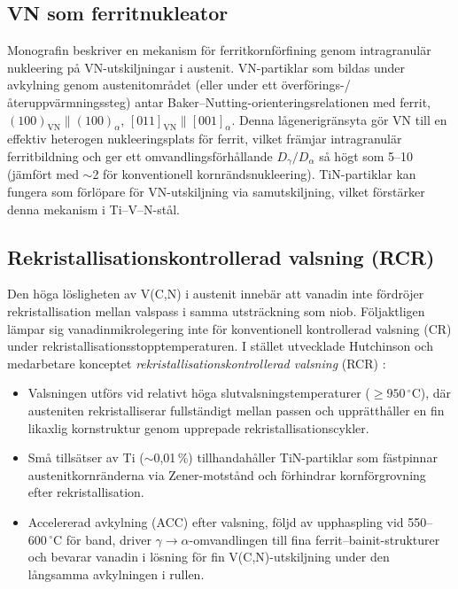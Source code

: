 \documentclass[11pt,a4paper]{article}
\begin{document}
\subsection{VN som ferritnukleator}

Monografin beskriver en mekanism f\"or ferritkornf\"orfining genom
intragranul\"ar nukleering p\aa{} VN-utskiljningar i austenit.
VN-partiklar som bildas under avkylning genom austenitomr\aa{}det (eller
under ett \"overf\"orings-/\aa{}teruppv\"armningssteg) antar
Baker--Nutting-orienteringsrelationen med ferrit,
$(100)_\text{VN}\parallel(100)_\alpha$,
$[011]_\text{VN}\parallel[001]_\alpha$.  Denna l\aa{}generigr\"ansyta
g\"or VN till en effektiv heterogen nukleeringsplats f\"or ferrit, vilket
fr\"amjar intragranul\"ar ferritbildning och ger ett
omvandlingsf\"orh\aa{}llande $D_\gamma/D_\alpha$ s\aa{} h\"ogt som 5--10
(j\"amf\"ort med $\sim$2 f\"or konventionell kornr\"andsnukleering).
TiN-partiklar kan fungera som f\"orl\"opare f\"or VN-utskiljning via
samutskiljning, vilket f\"orst\"arker denna mekanism i Ti--V--N-st\aa{}l.

\subsection{Rekristallisationskontrollerad valsning (RCR)}

Den h\"oga l\"osligheten av V(C,N) i austenit inneb\"ar att vanadin inte
f\"ordr\"ojer rekristallisation mellan valspass i samma utstr\"ackning
som niob.  F\"oljaktligen l\"ampar sig vanadinmikrolegering inte f\"or
konventionell kontrollerad valsning (CR) under
rekristallisationsstopptemperaturen.  I st\"allet utvecklade Hutchinson
och medarbetare konceptet \emph{rekristallisationskontrollerad valsning}
(RCR) \cite{Zajac1991,Siwecki1995}:

\begin{itemize}
  \item Valsningen utf\"ors vid relativt h\"oga slutvalsningstemperaturer
    ($\geq 950\,{}^\circ$C), d\"ar austeniten rekristalliserar fullst\"andigt
    mellan passen och uppr\"atth\aa{}ller en fin likaxlig kornstruktur
    genom upprepade rekristallisationscykler.
  \item Sm\aa{} tills\"atser av Ti ($\sim$0,01\,\%) tillhandah\aa{}ller
    TiN-partiklar som f\"astpinnar austenitkornr\"anderna via
    Zener-motst\aa{}nd och f\"orhindrar kornf\"orgrovning efter
    rekristallisation.
  \item Accelererad avkylning (ACC) efter valsning, f\"oljd av
    upphaspling vid 550--$600\,{}^\circ$C f\"or band, driver
    $\gamma\to\alpha$-omvandlingen till fina ferrit--bainit-strukturer
    och bevarar vanadin i l\"osning f\"or fin V(C,N)-utskiljning under
    den l\aa{}ngsamma avkylningen i rullen.
\end{itemize}
\end{document}
